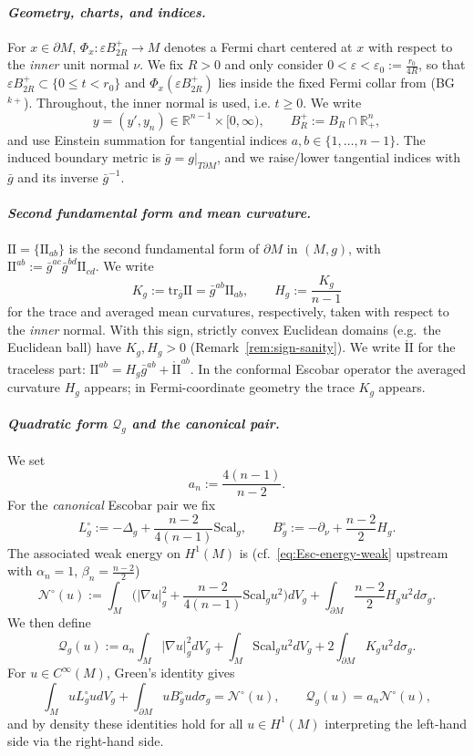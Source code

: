 \documentclass[11pt,reqno,a4paper]{amsart}
\newcommand{\R}{\mathbb{R}}
\numberwithin{equation}{section}
\theoremstyle{plain}
\newcommand{\Scal}{\mathrm{Scal}}
\theoremstyle{remark}
\theoremstyle{plain}
\begin{document}
\paragraph{\emph{Geometry, charts, and indices.}}
For $x\in\partial M$, $\Phi_x:\varepsilon B_{2R}^+\to M$ denotes a Fermi chart centered at $x$ with respect to the \emph{inner} unit normal $\nu$.  We fix $R>0$ and only consider $0<\varepsilon<\varepsilon_0:=\frac{r_0}{4R}$, so that $\varepsilon B_{2R}^+\subset\{0\le t<r_0\}$ and $\Phi_x(\varepsilon B_{2R}^+)$ lies inside the fixed Fermi collar from \textup{(BG$^{k+}$)}.
Throughout, the inner normal is used, i.e. $t\ge 0$.
We write
\[
y=(y',y_n)\in\R^{n-1}\times[0,\infty),\qquad B_{R}^+:=B_R\cap\R^n_+,
\]
and use Einstein summation for tangential indices $a,b\in\{1,\dots,n-1\}$. The induced boundary metric is $\bar g=g|_{T\partial M}$, and we raise/lower tangential indices with $\bar g$ and its inverse $\bar g^{-1}$.
\medskip
\paragraph{\emph{Second fundamental form and mean curvature.}}
$\mathrm{II}=\{\mathrm{II}_{ab}\}$ is the second fundamental form of $\partial M$ in $(M,g)$, with $\mathrm{II}^{ab}:=\bar g^{ac}\bar g^{bd}\mathrm{II}_{cd}$.
We write
\[
K_g:=\mathrm{tr}_{\bar g}\mathrm{II}=\bar g^{ab}\mathrm{II}_{ab},\qquad
H_g:=\frac{K_g}{n-1}
\]
for the trace and averaged mean curvatures, respectively,
taken with respect to the \emph{inner} normal.
With this sign, strictly convex Euclidean domains (e.g.\ the Euclidean ball) have $K_g,H_g>0$ (Remark~\ref{rem:sign-sanity}). We write $\mathring{\mathrm{II}}$ for the traceless part: $\mathrm{II}^{ab}=H_g\bar g^{ab}+\mathring{\mathrm{II}}^{ab}$.
In the conformal Escobar operator the averaged curvature $H_g$ appears; in Fermi-coordinate geometry the trace $K_g$ appears.
\medskip
\paragraph{\emph{Quadratic form $\mathcal Q_g$ and the canonical pair.}}
We set
\[
a_n:=\frac{4(n-1)}{n-2}.
\]
For the \emph{canonical} Escobar pair we fix
\begin{equation}\label{eq:canonical-pair}
L_g^{\circ}:=-\Delta_g+\frac{n-2}{4(n-1)}\Scal_g,\qquad
B_g^{\circ}:=-\partial_\nu+\frac{n-2}{2}H_g.
\end{equation}
The associated weak energy on $H^1(M)$ is (cf.\ \eqref{eq:Esc-energy-weak} upstream with $\alpha_n=1$, $\beta_n=\tfrac{n-2}{2}$)
\[
\mathcal N^\circ(u):=\int_M\Big(|\nabla u|_g^2+\frac{n-2}{4(n-1)}\Scal_gu^2\Big)dV_g
+\int_{\partial M}\frac{n-2}{2}H_gu^2d\sigma_g.
\]
We then define
\[
\mathcal Q_g(u):=a_n\int_M|\nabla u|_g^2dV_g+\int_M \Scal_gu^2dV_g
+2\int_{\partial M}K_gu^2d\sigma_g.
\]
For $u\in C^\infty(M)$, Green's identity gives
\begin{equation}\label{eq:bridge-firstorder}
\int_M uL_g^{\circ}udV_g+\int_{\partial M}uB_g^{\circ}ud\sigma_g
=\mathcal N^\circ(u),\qquad
\mathcal Q_g(u)=a_n\mathcal N^\circ(u),
\end{equation}
and by density these identities hold for all $u\in H^1(M)$ interpreting the left-hand side via the right-hand side.
\medskip
\end{document}
